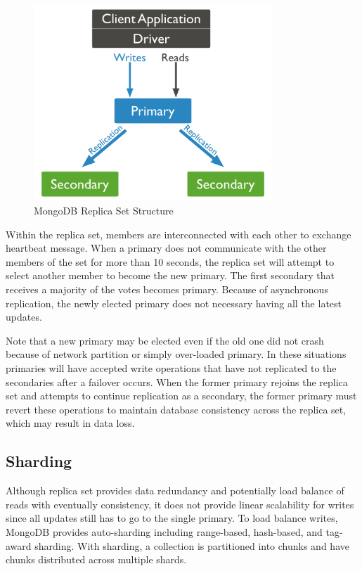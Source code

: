 \documentclass[12pt]{book}
\begin{document}
\begin{figure}[t]
\includegraphics[width=0.8\textwidth]{images/mongodb-replica-set.png}
\centering
\caption{MongoDB Replica Set Structure}
\end{figure}

Within the replica set, members are interconnected with each other to exchange heartbeat message. When a primary does not communicate with the other members of the set for more than 10 seconds, the replica set will attempt to select another member to become the new primary. The first secondary that receives a majority of the votes becomes primary. Because of asynchronous replication, the newly elected primary does not necessary having all the latest updates.

Note that a new primary may be elected even if the old one did not crash because of network partition or simply over-loaded primary. In these situations primaries will have accepted write operations that have not replicated to the secondaries after a failover occurs. When the former primary rejoins the replica set and attempts to continue replication as a secondary, the former primary must revert these operations to maintain database consistency across the replica set, which may result in data loss.

\subsection{Sharding}

Although replica set provides data redundancy and potentially load balance of reads with eventually consistency, it does not provide linear scalability for writes since all updates still has to go to the single primary. To load balance writes, MongoDB provides auto-sharding including range-based, hash-based, and tag-award sharding. With sharding, a collection is partitioned into chunks and have chunks distributed across multiple shards.
\end{document}
